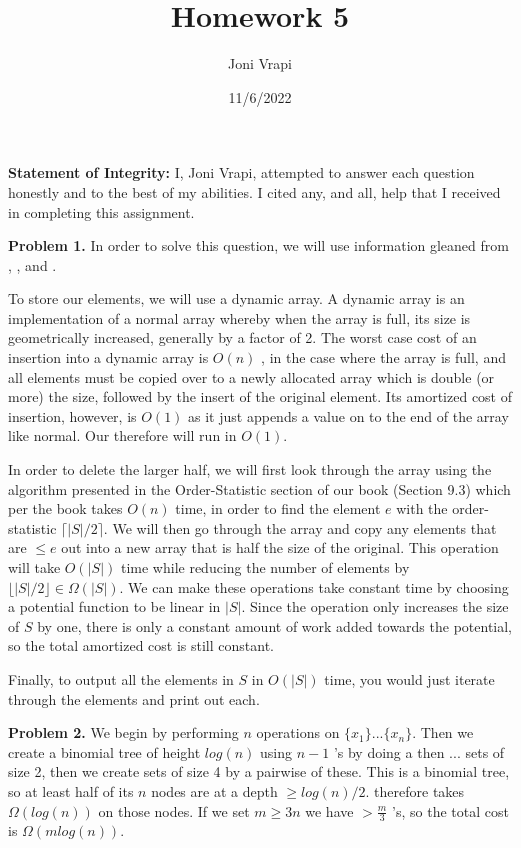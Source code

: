 \documentclass{article}
\title{Homework 5}
\author{Joni Vrapi}
\date{11/6/2022}
\begin{document}
\maketitle

\textbf{Statement of Integrity:} I, Joni Vrapi, attempted to answer each question honestly and to the best of my abilities. I cited any, and all, help that I received in completing this assignment.

\hfill

\textbf{Problem 1.} In order to solve this question, we will use information gleaned from \cite{CLRS}, \cite{website:2}, and \cite{website:3}.

To store our elements, we will use a dynamic array. A dynamic array is an implementation of a normal array whereby when the array is full, its size is geometrically increased, generally by a factor of 2. The worst case cost of an insertion into a dynamic array is $O(n)$ \cite{website:5}, in the case where the array is full, and all elements must be copied over to a newly allocated array which is double (or more) the size, followed by the insert of the original element. Its amortized cost of insertion, however, is $O(1)$ as it just appends a value on to the end of the array like normal. Our  therefore will run in $O(1)$. 

\hfill

In order to delete the larger half, we will first look through the array using the  algorithm presented in the Order-Statistic section of our book (Section 9.3) \cite{CLRS} which per the book takes $O(n)$ time, in order to find the element $e$ with the order-statistic $\lceil |S|/2 \rceil$. We will then go through the array and copy any elements that are $\leq e$ out into a new array that is half the size of the original. This operation will take $O(|S|)$ time while reducing the number of elements by $\lfloor |S|/2 \rfloor \in \Omega(|S|)$. We can make these operations take constant time by choosing a potential function to be linear in $|S|$. Since the  operation only increases the size of $S$ by one, there is only a constant amount of work added towards the potential, so the total amortized cost is still constant.

\hfill

Finally, to output all the elements in $S$ in $O(|S|)$ time, you would just iterate through the elements and print out each.

\hfill

\textbf{Problem 2.} We begin by performing \cite{website:6} $n$  operations on $\{x_1\}...\{x_n\}$. Then we create a binomial tree of height $log(n)$ using $n - 1$ 's by doing a  then $...$ sets of size 2, then we create sets of size 4 by a pairwise  of these. This is a binomial tree, so at least half of its $n$ nodes are at a depth $\geq log(n)/2$.  therefore takes $\Omega(log(n))$ on those nodes. If we set $m \geq 3n$ we have $> \frac{m}{3}$ 's, so the total cost is $\Omega(mlog(n))$.
\end{document}
